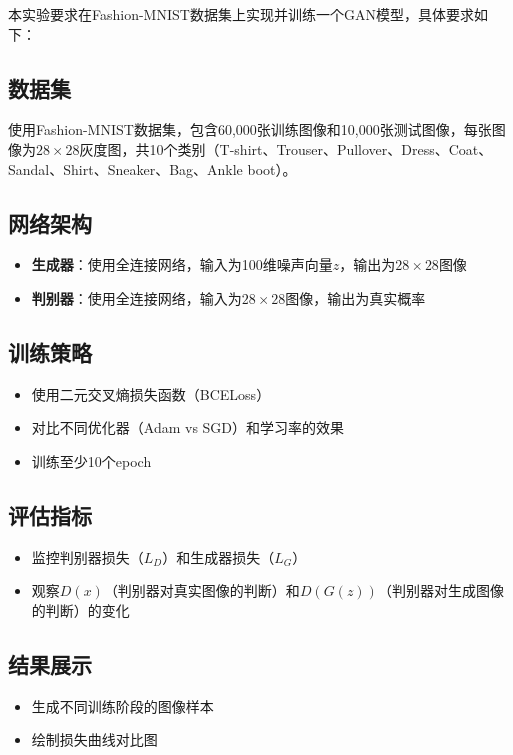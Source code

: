 \documentclass[a4paper]{article}
\begin{document}
本实验要求在Fashion-MNIST数据集上实现并训练一个GAN模型，具体要求如下：

\subsection{数据集}
使用Fashion-MNIST数据集，包含60,000张训练图像和10,000张测试图像，每张图像为$28 \times 28$灰度图，共10个类别（T-shirt、Trouser、Pullover、Dress、Coat、Sandal、Shirt、Sneaker、Bag、Ankle boot）。

\subsection{网络架构}
\begin{itemize}
    \item \textbf{生成器}：使用全连接网络，输入为100维噪声向量$z$，输出为$28 \times 28$图像
    \item \textbf{判别器}：使用全连接网络，输入为$28 \times 28$图像，输出为真实概率
\end{itemize}

\subsection{训练策略}
\begin{itemize}
    \item 使用二元交叉熵损失函数（BCELoss）
    \item 对比不同优化器（Adam vs SGD）和学习率的效果
    \item 训练至少10个epoch
\end{itemize}

\subsection{评估指标}
\begin{itemize}
    \item 监控判别器损失（$L_D$）和生成器损失（$L_G$）
    \item 观察$D(x)$（判别器对真实图像的判断）和$D(G(z))$（判别器对生成图像的判断）的变化
\end{itemize}

\subsection{结果展示}
\begin{itemize}
    \item 生成不同训练阶段的图像样本
    \item 绘制损失曲线对比图
\end{itemize}
\end{document}
